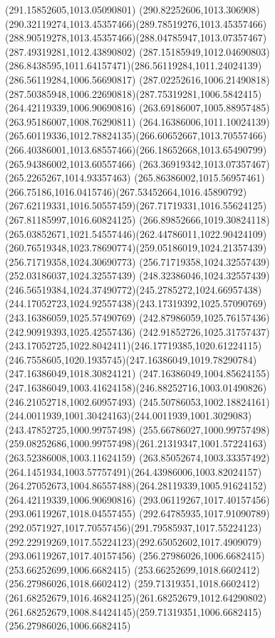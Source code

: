 {{	\lineto(291.15852605,1013.05090801)
	\curveto(290.82252606,1013.306908)(290.32119274,1013.45357466)(289.78519276,1013.45357466)
	\curveto(288.90519278,1013.45357466)(288.04785947,1013.07357467)(287.49319281,1012.43890802)
	\curveto(287.15185949,1012.04690803)(286.8438595,1011.64157471)(286.56119284,1011.24024139)
	\lineto(286.56119284,1006.56690817)
	\curveto(287.02252616,1006.21490818)(287.50385948,1006.22690818)(287.75319281,1006.5842415)
	\moveto(264.42119339,1006.90690816)
	\lineto(263.69186007,1005.88957485)
	\lineto(263.95186007,1008.76290811)
	\curveto(264.16386006,1011.10024139)(265.60119336,1012.78824135)(266.60652667,1013.70557466)
	\curveto(266.40386001,1013.68557466)(266.18652668,1013.65490799)(265.94386002,1013.60557466)
	\lineto(263.36919342,1013.07357467)
	\lineto(265.2265267,1014.93357463)
	\curveto(265.86386002,1015.56957461)(266.75186,1016.0415746)(267.53452664,1016.45890792)
	\curveto(267.62119331,1016.50557459)(267.71719331,1016.55624125)(267.81185997,1016.60824125)
	\curveto(266.89852666,1019.30824118)(265.03852671,1021.54557446)(262.44786011,1022.90424109)
	\curveto(260.76519348,1023.78690774)(259.05186019,1024.21357439)(256.71719358,1024.30690773)
	\lineto(256.71719358,1024.32557439)
	\lineto(252.03186037,1024.32557439)
	\curveto(248.32386046,1024.32557439)(246.56519384,1024.37490772)(245.2785272,1024.66957438)
	\curveto(244.17052723,1024.92557438)(243.17319392,1025.57090769)(243.16386059,1025.57490769)
	\lineto(242.87986059,1025.76157436)
	\lineto(242.90919393,1025.42557436)
	\curveto(242.91852726,1025.31757437)(243.17052725,1022.8042411)(246.17719385,1020.61224115)
	\curveto(246.7558605,1020.1935745)(247.16386049,1019.78290784)(247.16386049,1018.30824121)
	\lineto(247.16386049,1004.85624155)
	\curveto(247.16386049,1003.41624158)(246.88252716,1003.01490826)(246.21052718,1002.60957493)
	\curveto(245.50786053,1002.18824161)(244.0011939,1001.30424163)(244.0011939,1001.3029083)
	\lineto(243.47852725,1000.99757498)
	\lineto(255.66786027,1000.99757498)
	\curveto(259.08252686,1000.99757498)(261.21319347,1001.57224163)(263.52386008,1003.11624159)
	\curveto(263.85052674,1003.33357492)(264.1451934,1003.57757491)(264.43986006,1003.82024157)
	\curveto(264.27052673,1004.86557488)(264.28119339,1005.91624152)(264.42119339,1006.90690816)
	\moveto(293.06119267,1017.40157456)
	\lineto(293.06119267,1018.04557455)
	\curveto(292.64785935,1017.91090789)(292.0571927,1017.70557456)(291.79585937,1017.55224123)
	\curveto(292.22919269,1017.55224123)(292.65052602,1017.4909079)(293.06119267,1017.40157456)
	\moveto(256.27986026,1006.6682415)
	\lineto(253.66252699,1006.6682415)
	\lineto(253.66252699,1018.6602412)
	\lineto(256.27986026,1018.6602412)
	\curveto(259.71319351,1018.6602412)(261.68252679,1016.46824125)(261.68252679,1012.64290802)
	\curveto(261.68252679,1008.84424145)(259.71319351,1006.6682415)(256.27986026,1006.6682415)
}
}
